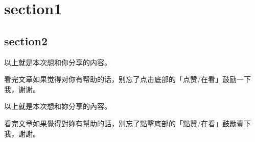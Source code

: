 \documentclass[a4paper]{article}
\begin{document}


\linespread{1.4} \selectfont


\section{section1}

\subsection{section2}
以上就是本次想和你分享的内容。

看完文章如果觉得对你有帮助的话，别忘了点击底部的「点赞/在看」鼓励一下我，谢谢。

以上就是本次想和妳分享的內容。

看完文章如果覺得對妳有幫助的話，別忘了點擊底部的「點贊/在看」鼓勵壹下我，謝謝。
\end{document}
